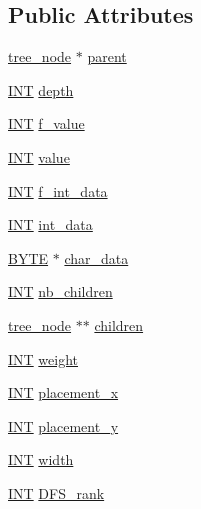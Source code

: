 \subsection*{Public Attributes}
\begin{DoxyCompactItemize}
\item 
\mbox{\hyperlink{classtree__node}{tree\+\_\+node}} $\ast$ \mbox{\hyperlink{classtree__node_a649ed45f2f6567a59e9cd53024a8ba41}{parent}}
\item 
\mbox{\hyperlink{galois_8h_a09fddde158a3a20bd2dcadb609de11dc}{I\+NT}} \mbox{\hyperlink{classtree__node_aa5529f7dcfe7aeda758c538cb4b5a6e6}{depth}}
\item 
\mbox{\hyperlink{galois_8h_a09fddde158a3a20bd2dcadb609de11dc}{I\+NT}} \mbox{\hyperlink{classtree__node_ad9a2e980d0a2215b687a2fb110bcc749}{f\+\_\+value}}
\item 
\mbox{\hyperlink{galois_8h_a09fddde158a3a20bd2dcadb609de11dc}{I\+NT}} \mbox{\hyperlink{classtree__node_a16080347be28a0cfa223c05b52524720}{value}}
\item 
\mbox{\hyperlink{galois_8h_a09fddde158a3a20bd2dcadb609de11dc}{I\+NT}} \mbox{\hyperlink{classtree__node_a484d5d5926b2b3546ffeccb3476c7c87}{f\+\_\+int\+\_\+data}}
\item 
\mbox{\hyperlink{galois_8h_a09fddde158a3a20bd2dcadb609de11dc}{I\+NT}} \mbox{\hyperlink{classtree__node_a18f356c5a01f8cbd7ee2240ced5b6596}{int\+\_\+data}}
\item 
\mbox{\hyperlink{galois_8h_ab6cc7b4aeb6ea31aba2b3fbfc83ff5e6}{B\+Y\+TE}} $\ast$ \mbox{\hyperlink{classtree__node_a591201881dce40688470d0189f8a0900}{char\+\_\+data}}
\item 
\mbox{\hyperlink{galois_8h_a09fddde158a3a20bd2dcadb609de11dc}{I\+NT}} \mbox{\hyperlink{classtree__node_a7837cc95e4e5de0bbc8880b85c65ddf9}{nb\+\_\+children}}
\item 
\mbox{\hyperlink{classtree__node}{tree\+\_\+node}} $\ast$$\ast$ \mbox{\hyperlink{classtree__node_a9d59505313b9570add61f5197e7f72f0}{children}}
\item 
\mbox{\hyperlink{galois_8h_a09fddde158a3a20bd2dcadb609de11dc}{I\+NT}} \mbox{\hyperlink{classtree__node_a0a276f61a17a2ff66cd64f8fc9897dc2}{weight}}
\item 
\mbox{\hyperlink{galois_8h_a09fddde158a3a20bd2dcadb609de11dc}{I\+NT}} \mbox{\hyperlink{classtree__node_a06635c3b6c4eb745009183cc3735b372}{placement\+\_\+x}}
\item 
\mbox{\hyperlink{galois_8h_a09fddde158a3a20bd2dcadb609de11dc}{I\+NT}} \mbox{\hyperlink{classtree__node_a26b8c520c8b4259a5b78d20565557ad1}{placement\+\_\+y}}
\item 
\mbox{\hyperlink{galois_8h_a09fddde158a3a20bd2dcadb609de11dc}{I\+NT}} \mbox{\hyperlink{classtree__node_a25a99d66462002bafce23a7b36c1cbff}{width}}
\item 
\mbox{\hyperlink{galois_8h_a09fddde158a3a20bd2dcadb609de11dc}{I\+NT}} \mbox{\hyperlink{classtree__node_a6a943fdc22c8fb4c6434614a9d28b1ab}{D\+F\+S\+\_\+rank}}
\end{DoxyCompactItemize}


